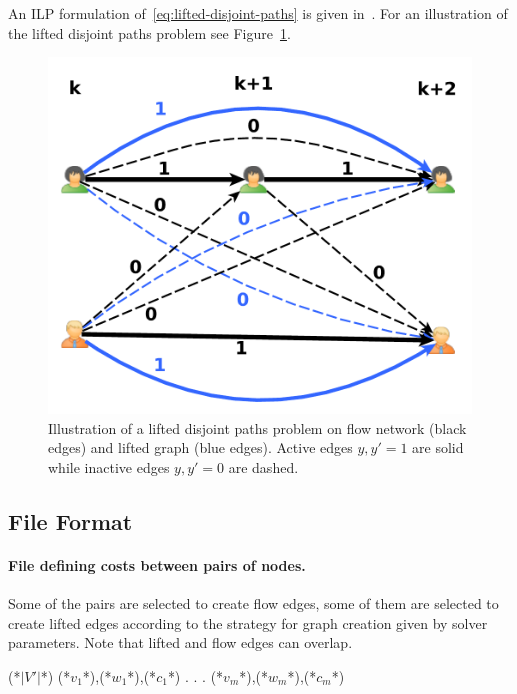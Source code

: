 An ILP formulation of~\eqref{eq:lifted-disjoint-paths} is given in~\cite{hornakova2020lifted}.
For an illustration of the lifted disjoint paths problem see Figure~\ref{fig:LDP}.

%

\begin{figure}
	\centering
	\includegraphics[width=0.9\columnwidth]{images/illustrationLDP}
	\caption{Illustration of a lifted disjoint paths problem on flow network (black edges) and lifted graph (blue edges).
		Active edges $y,y' = 1$ are solid while inactive edges $y,y' = 0$ are dashed.}
	\label{fig:LDP}	
\end{figure}


\subsection{File Format}
\paragraph{File defining costs between pairs of nodes.} Some of the pairs are selected to create flow edges, some of them are selected to create lifted edges according to the strategy for graph creation given by solver parameters. Note that lifted and flow edges can overlap. 
\begin{fileformat}
(*$|V'|$*)
(*$v_1$*),(*$w_1$*),(*$c_1$*)
.
.
.
(*$v_m$*),(*$w_m$*),(*$c_m$*) 
\end{fileformat}
